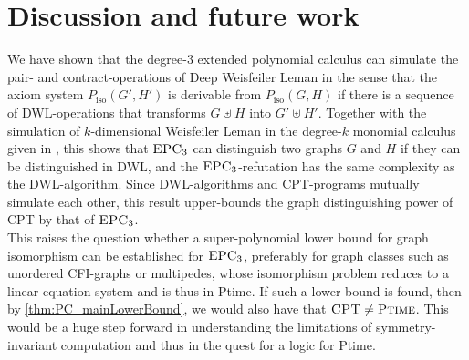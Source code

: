 \documentclass[10pt,a4paper]{article}
\newcommand{\CPT}{\mbox{\sc CPT}}
\newcommand{\EPC}{\mbox{\sc EPC}}
\newcommand{\ptime}{\mbox{\sc Ptime}}
\newcommand{\Piso}{P_{\text{iso}}}
\begin{document}
	
	
	
	
	
	
	\section{Discussion and future work}
	We have shown that the degree-$3$ extended polynomial calculus can simulate the pair- and contract-operations of Deep Weisfeiler Leman in the sense that the axiom system $\Piso(G',H')$ is derivable from $\Piso(G,H)$ if there is a sequence of DWL-operations that transforms $G \uplus H$ into $G' \uplus H'$. Together with the simulation of $k$-dimensional Weisfeiler Leman in the degree-$k$ monomial calculus given in \cite{berkholz}, this shows that $\EPC_3$ can distinguish two graphs $G$ and $H$ if they can be distinguished in DWL, and the $\EPC_3$-refutation has the same complexity as the DWL-algorithm. Since DWL-algorithms and CPT-programs mutually simulate each other, this result upper-bounds the graph distinguishing power of CPT by that of $\EPC_3$.\\
	
	This raises the question whether a super-polynomial lower bound for graph isomorphism can be established for $\EPC_3$, preferably for graph classes such as unordered CFI-graphs or multipedes, whose isomorphism problem reduces to a linear equation system and is thus in \ptime. If such a lower bound is found, then by \autoref{thm:PC_mainLowerBound}, we would also have that $\CPT \neq \ptime$. This would be a huge step forward in understanding the limitations of symmetry-invariant computation and thus in the quest for a logic for \ptime.\\
	
\end{document}
